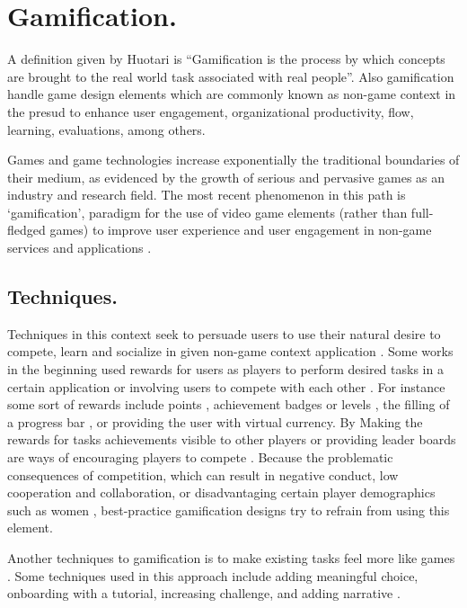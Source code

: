 \section{Gamification.}

A definition given by Huotari  \cite{huotari2012defining} is  “Gamification is
the process by which concepts are brought to the real world task associated with
real people”. Also gamification handle game design elements which are commonly
known as non-game context in the presud to  enhance user engagement,
organizational productivity, flow, learning, evaluations, among others.

Games and game technologies increase exponentially the traditional boundaries of
their medium, as evidenced by the growth of serious and pervasive games as an
industry and research field. The most recent phenomenon in this path is
‘gamification’, paradigm for the use of video game elements (rather than full-
fledged games) to improve user experience and user engagement in non-game
services and applications \cite{deterding2011gamification}.

\subsection{Techniques.}


Techniques in this context seek to persuade users to use their natural desire to
compete, learn and socialize in given non-game context application
\cite{deterding2011game}\cite{hamari2014does}.  Some works in the beginning used
rewards for users as players to perform desired tasks in a certain application
or involving users to compete with each other . For instance some sort of
rewards include points \cite{sutter2010browse}, achievement badges or levels
\cite{hamari2011framework}, the filling of a progress bar \cite{o2010get}, or
providing the user with virtual currency. By Making the rewards for  tasks
achievements visible to other players or providing leader boards are ways of
encouraging players to compete \cite{hickman2010total}. Because the  problematic
consequences of competition, which can result in negative conduct, low
cooperation and collaboration, or disadvantaging certain player demographics
such as women \cite{kumar2013gamification}, best-practice gamification designs
try to refrain from using this element.

Another techniques to gamification is to make existing tasks feel more like
games \cite{deterding2010just}. Some techniques used in this approach include
adding meaningful choice, onboarding with a tutorial, increasing challenge, and
adding narrative \cite{mcgonigal2011reality}.
